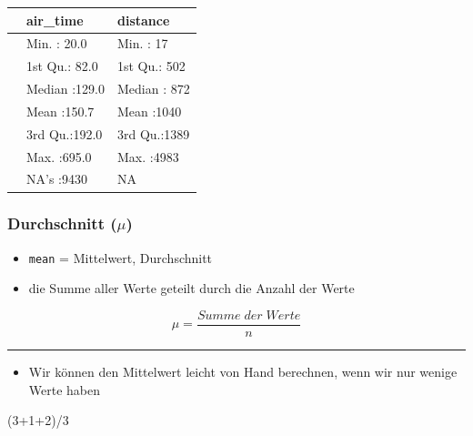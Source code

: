 \documentclass[
  letterpaper,
  DIV=11]{scrartcl}
\newenvironment{Shaded}{\begin{snugshade}}{\end{snugshade}}
\newcommand{\DecValTok}[1]{\textcolor[rgb]{0.68,0.00,0.00}{#1}}
\newcommand{\NormalTok}[1]{\textcolor[rgb]{0.00,0.23,0.31}{#1}}
\newcommand{\SpecialCharTok}[1]{\textcolor[rgb]{0.37,0.37,0.37}{#1}}
\providecommand{\tightlist}{%
  \setlength{\itemsep}{0pt}\setlength{\parskip}{0pt}}\usepackage{longtable,booktabs,array}
\begin{document}
\begin{table}
\centering\begingroup\fontsize{30}{32}\selectfont

\begin{tabular}{l|l|l}
\hline
  &    air\_time &    distance\\
\hline
 & Min.   : 20.0 & Min.   :  17\\
\hline
 & 1st Qu.: 82.0 & 1st Qu.: 502\\
\hline
 & Median :129.0 & Median : 872\\
\hline
 & Mean   :150.7 & Mean   :1040\\
\hline
 & 3rd Qu.:192.0 & 3rd Qu.:1389\\
\hline
 & Max.   :695.0 & Max.   :4983\\
\hline
 & NA's   :9430 & NA\\
\hline
\end{tabular}
\endgroup{}
\end{table}

\hypertarget{durchschnitt-mu}{%
\subsubsection{\texorpdfstring{Durchschnitt
(\(\mu\))}{Durchschnitt (\textbackslash mu)}}\label{durchschnitt-mu}}

\begin{itemize}
\tightlist
\item
  \texttt{mean} = Mittelwert, Durchschnitt
\item
  die Summe aller Werte geteilt durch die Anzahl der Werte
\end{itemize}

\[
\mu = \frac{Summe\;der\;Werte}
           {n}
\]

\begin{center}\rule{0.5\linewidth}{0.5pt}\end{center}

\begin{itemize}
\tightlist
\item
  Wir können den Mittelwert leicht von Hand berechnen, wenn wir nur
  wenige Werte haben
\end{itemize}

\begin{Shaded}
\begin{Highlighting}[]
\NormalTok{(}\DecValTok{3}\SpecialCharTok{+}\DecValTok{1}\SpecialCharTok{+}\DecValTok{2}\NormalTok{)}\SpecialCharTok{/}\DecValTok{3}
\end{Highlighting}
\end{Shaded}
\end{document}
